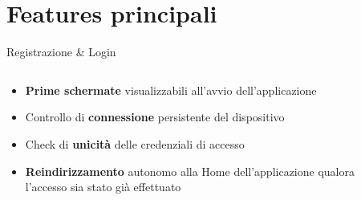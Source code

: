 \documentclass[10pt]{beamer}
\begin{document}
\section{Features principali}
\begin{frame}{Registrazione \& Login}
    \begin{columns}
        \begin{column}{0.5\textwidth}
            \hspace*{100pt}
            \begin{itemize}
                \item \small \textbf{Prime schermate} visualizzabili all'avvio dell'applicazione
                \item \small Controllo di \textbf{connessione} persistente del dispositivo
                \item \small Check di \textbf{unicità} delle credenziali di accesso
                \item \small \textbf{Reindirizzamento} autonomo alla Home dell'applicazione qualora l'accesso sia stato già effettuato
            \end{itemize}
        \end{column}
        \begin{column}{0.5\textwidth}
            \begin{center}
            \end{center}
        \end{column}
    \end{columns}
\end{frame}
\end{document}
